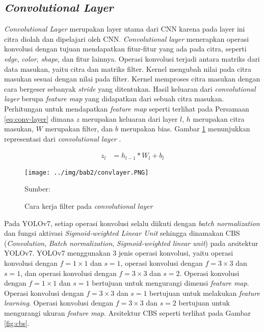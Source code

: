     \subsection{\textit{Convolutional Layer}}
    \textit{Convolutional Layer} merupakan layer utama dari CNN karena pada layer ini citra diolah dan dipelajari oleh CNN. \textit{Convolutional layer} menerapkan operasi konvolusi dengan tujuan mendapatkan fitur-fitur yang ada pada citra, seperti \textit{edge}, \textit{color}, \textit{shape}, dan fitur lainnya. Operasi konvolusi terjadi antara matriks dari data masukan, yaitu citra dan matriks filter. Kernel mengubah nilai pada citra masukan sesuai dengan nilai pada filter. Kernel memproses citra masukan dengan cara bergeser sebanyak \textit{stride} yang ditentukan. Hasil keluaran dari \textit{convolutional layer} berupa \textit{feature map} yang didapatkan dari sebuah citra masukan. Perhitungan untuk mendapatkan \textit{feature map} seperti terlihat pada Persamaan \ref{eq:conv-layer} dimana $z$ merupakan keluaran dari layer $l$, $h$ merupakan citra masukan, $W$ merupakan filter, dan $b$ merupakan bias. Gambar \ref{fig:conv} menunjukkan representasi dari \textit{convolutional layer} \citep{OShea2015}.

    \begin{align}
        \label{eq:conv-layer}
        z_l &= h_{l-1}\ast W_l + b_l
    \end{align}

    \begin{figure}[H]
        \begin{center}
            \texttt{[image: ../img/bab2/convlayer.PNG]}
            \caption{Cara kerja filter pada \textit{convolutional layer}}
            \label{fig:conv}
            Sumber: \citep{OShea2015}
        \end{center}
    \end{figure}

    Pada YOLOv7, setiap operasi konvolusi selalu diikuti dengan \textit{batch normalization} dan fungsi aktivasi \textit{Sigmoid-weighted Linear Unit} sehingga dinamakan CBS (\textit{Convolution}, \textit{Batch normalization}, \textit{Sigmoid-weighted linear unit}) pada arsitektur YOLOv7. YOLOv7 menggunakan 3 jenis operasi konvolusi, yaitu operasi konvolusi dengan $f=1\times 1$ dan $s=1$, operasi konvolusi dengan $f=3\times 3$ dan $s=1$, dan operasi konvolusi dengan $f=3\times 3$ dan $s=2$. Operasi konvolusi dengan $f=1\times 1$ dan $s=1$ bertujuan untuk mengurangi dimensi \textit{feature map}. Operasi konvolusi dengan $f=3\times 3$ dan $s=1$ bertujuan untuk melakukan \textit{feature learning}. Operasi konvolusi dengan $f=3\times 3$ dan $s=2$ bertujuan untuk mengurangi ukuran \textit{feature map}. Arsitektur CBS seperti terlihat pada Gambar \ref{fig:cbs}.


